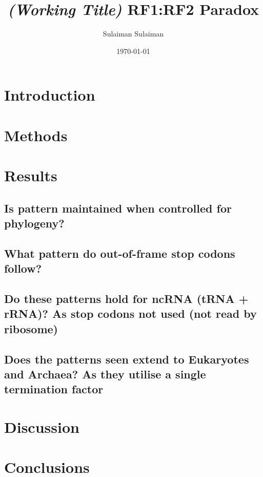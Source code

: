 \documentclass[
    emulatestandardclasses,
    parskip=half,
]{article}
\begin{document}
    \title{\textit{(Working Title)} RF1:RF2 Paradox}
    \date{\today}
    \author{Sulaiman Sulaiman}
    \maketitle

    \begin{abstract}
    \end{abstract}
    \section{Introduction}
    \section{Methods}
    \section{Results}
        \subsection{Is pattern maintained when controlled for phylogeny?}
        \subsection{What pattern do out-of-frame stop codons follow?}
        \subsection{Do these patterns hold for ncRNA (tRNA + rRNA)?
                    As stop codons not used (not read by ribosome)}
        \subsection{Does the patterns seen extend to Eukaryotes and Archaea?
                    As they utilise a single termination factor}
    \section{Discussion}
    \section{Conclusions}

	\newpage {}
	\printbibliography
	\appendix\appendixpage
\end{document}
